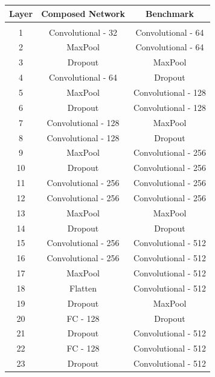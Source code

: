 \begin{table}
    \centering
    \begin{tabular}{|c|c|c|}
        \hline
        \textbf{Layer} & \textbf{Composed Network} & \textbf{Benchmark} \\
        \hline
        \multicolumn{3}{c}{} \\[-2ex]
        \hline
        1 & Convolutional - 32 & Convolutional - 64 \\
        \hline
        2 & MaxPool & Convolutional - 64 \\
        \hline
        3 & Dropout & MaxPool \\
        \hline
        4 & Convolutional - 64 & Dropout \\
        \hline
        5 & MaxPool & Convolutional - 128 \\
        \hline
        6 & Dropout & Convolutional - 128 \\
        \hline
        7 & Convolutional - 128 & MaxPool \\
        \hline
        8 & Convolutional - 128 & Dropout \\
        \hline
        9 & MaxPool & Convolutional - 256 \\
        \hline
        10 & Dropout & Convolutional - 256 \\
        \hline
        11 & Convolutional - 256 & Convolutional - 256 \\
        \hline
        12 & Convolutional - 256 & Convolutional - 256 \\
        \hline
        13 & MaxPool & MaxPool \\
        \hline
        14 & Dropout & Dropout \\
        \hline
        15 & Convolutional - 256 & Convolutional - 512 \\
        \hline
        16 & Convolutional - 256 & Convolutional - 512 \\
        \hline
        17 & MaxPool & Convolutional - 512 \\
        \hline
        18 & Flatten & Convolutional - 512 \\
        \hline
        19 & Dropout & MaxPool \\
        \hline
        20 & FC - 128 & Dropout \\
        \hline
        21 & Dropout & Convolutional - 512 \\
        \hline
        22 & FC - 128 & Convolutional - 512 \\
        \hline
        23 & Dropout & Convolutional - 512 \\

\end{tabular}
\end{table}
